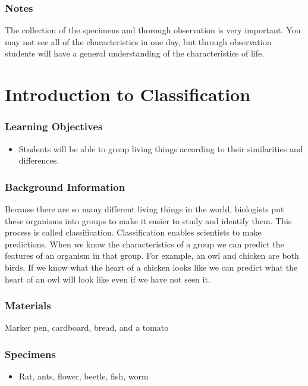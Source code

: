 \subsubsection*{Notes}
The collection of the specimens and thorough observation is very important. You may not see all of the characteristics in one day, but through observation students will have a general understanding of the characteristics of life.


\section{Introduction to Classification}

\subsubsection*{Learning Objectives}
\begin{itemize}
\item{Students will be able to group living things according to their similarities and differences.}
\end{itemize}

\subsubsection*{Background Information}
Because there are so many different living things in the world, biologists put these organisms into groups to make it easier to study and identify them. This process is called classification. Classification enables scientists to make predictions. When we know the characteristics of a group we can predict the features of an organism in that group. For example, an owl and chicken are both birds. If we know what the heart of a chicken looks like we can predict what the heart of an owl will look like even if we have not seen it.

\subsubsection*{Materials}
Marker pen, cardboard, bread, and a tomato

\subsubsection*{Specimens}
\begin{itemize}
\item{Rat, ants, flower, beetle, fish, worm}
\end{itemize}

